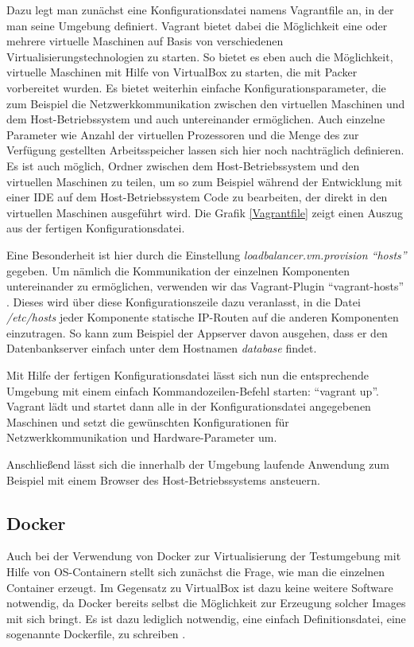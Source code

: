 Dazu legt man zunächst eine Konfigurationsdatei namens Vagrantfile an, in der man seine Umgebung definiert. Vagrant bietet dabei die Möglichkeit eine oder mehrere virtuelle Maschinen auf Basis von verschiedenen Virtualisierungstechnologien zu starten. So bietet es eben auch die Möglichkeit, virtuelle Maschinen mit Hilfe von VirtualBox zu starten, die mit Packer vorbereitet wurden. Es bietet weiterhin einfache Konfigurationsparameter, die zum Beispiel die Netzwerkkommunikation zwischen den virtuellen Maschinen und dem Host-Betriebssystem und auch untereinander ermöglichen. Auch einzelne Parameter wie Anzahl der virtuellen Prozessoren und die Menge des zur Verfügung gestellten Arbeitsspeicher lassen sich hier noch nachträglich definieren. Es ist auch möglich, Ordner zwischen dem Host-Betriebssystem und den virtuellen Maschinen zu teilen, um so zum Beispiel während der Entwicklung mit einer IDE auf dem Host-Betriebssystem Code zu bearbeiten, der direkt in den virtuellen Maschinen ausgeführt wird. Die Grafik \ref{Vagrantfile} zeigt einen Auszug aus der fertigen Konfigurationsdatei.

Eine Besonderheit ist hier durch die Einstellung \textit{loadbalancer.vm.provision "`hosts"'} gegeben. Um nämlich die Kommunikation der einzelnen Komponenten untereinander zu ermöglichen, verwenden wir das Vagrant-Plugin "`vagrant-hosts"' \citep[Vgl.][]{vagranthosts}. Dieses wird über diese Konfigurationszeile dazu veranlasst, in die Datei \textit{/etc/hosts} jeder Komponente statische IP-Routen auf die anderen Komponenten einzutragen. So kann zum Beispiel der Appserver davon ausgehen, dass er den Datenbankserver einfach unter dem Hostnamen \textit{database} findet.

Mit Hilfe der fertigen Konfigurationsdatei lässt sich nun die entsprechende Umgebung mit einem einfach Kommandozeilen-Befehl starten: "`vagrant up"'. Vagrant lädt und startet dann alle in der Konfigurationsdatei angegebenen Maschinen und setzt die gewünschten Konfigurationen für Netzwerkkommunikation und Hardware-Parameter um.

Anschließend lässt sich die innerhalb der Umgebung laufende Anwendung zum Beispiel mit einem Browser des Host-Betriebssystems ansteuern.

\subsection{Docker}

Auch bei der Verwendung von Docker zur Virtualisierung der Testumgebung mit Hilfe von OS-Containern stellt sich zunächst die Frage, wie man die einzelnen Container erzeugt. Im Gegensatz zu VirtualBox ist dazu keine weitere Software notwendig, da Docker bereits selbst die Möglichkeit zur Erzeugung solcher Images mit sich bringt. Es ist dazu lediglich notwendig, eine einfach Definitionsdatei, eine sogenannte Dockerfile, zu schreiben \citep[Vgl.][]{docker:003}.

